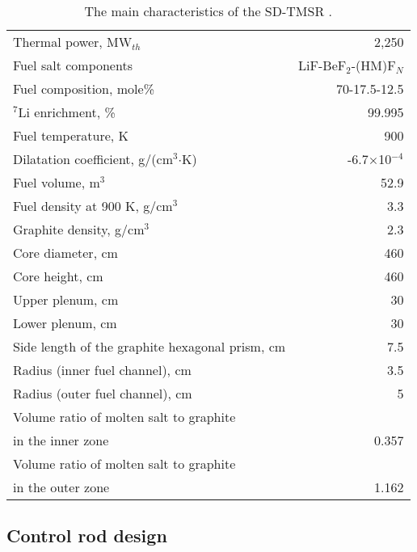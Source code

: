 \begin{table}  %
	\caption{The main characteristics of the SD-TMSR \cite{li_optimization_2018,ashraf2020whole}.}
	\vspace{0.1in}
	\begin{tabularx}{\textwidth}{l | r}
		\hline
		Thermal power, MW$_{th}$          				&  2,250  \\ 
		Fuel salt components                            & LiF-BeF$_2$-(\gls{HM})F$_N$ \\
		Fuel composition, mole\%                        & 70-17.5-12.5    \\
		$^7$Li enrichment, \%        				& 99.995   \\
		Fuel temperature, K 							& 900  \\
		Dilatation coefficient, g/(cm$^3$$\cdot{}$K)  &  -6.7$\times$10$^{-4}$ \\ 
		Fuel volume, m$^3$  &	52.9 \\
		Fuel density at 900 K, g/cm$^3$		  		& 3.3 \\
		Graphite density, g/cm$^3$             	    & 2.3	\\ 
		Core diameter, cm								& 460  \\
		Core height, cm									& 460  \\
		Upper plenum, cm								& 30  \\
		Lower plenum, cm								& 30  \\
		Side length of the graphite hexagonal prism, cm   & 7.5 \\
		Radius (inner fuel channel), cm							& 3.5  \\
		Radius (outer fuel channel), cm							& 5  \\
		Volume ratio of molten salt to graphite \\in the inner zone	&  0.357  \\
		Volume ratio of molten salt to graphite \\in the outer zone &  1.162  \\
		
		\hline
	\end{tabularx}
	\label{tab:table1}
\end{table}

\subsection{Control rod design} \label{CRD}

